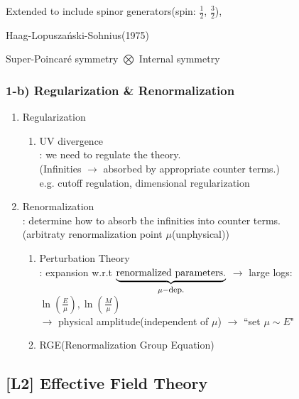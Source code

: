 \documentclass[11pt,letterpaper]{article}
\begin{document}
%
Extended to include spinor generators(spin: $\tfrac{1}{2}$, $\tfrac{3}{2}$),
%

\begin{note}
 Haag-Lopusza\'{n}ski-Sohnius(1975)
 { \normalfont
  \begin{center}
   Super-Poincar\'{e} symmetry $\bigotimes$ Internal symmetry
  \end{center}
 }
\end{note}

\VS

\subsubsection*{\normalfont \bfseries 1-b) Regularization \& Renormalization}
%
\begin{enumerate}
  \item Regularization
  \begin{enumerate}
    \item UV divergence \\
            : we need to regulate the theory. \\
         (Infinities $\rightarrow$ absorbed by appropriate counter terms.) \\
         e.g. cutoff regulation, dimensional regularization
  \end{enumerate}
  \item Renormalization \\
        : determine how to absorb the infinities into counter terms. \\
        (arbitraty renormalization point $\mu$(unphysical))
   \begin{enumerate}
     \item Perturbation Theory \\
            : expansion w.r.t $\underbrace{\mbox{renormalized parameters.}}_{\SM \mu - \mbox{dep.}}$
             $\rightarrow$ large logs: $\ln(\frac{E}{\mu}), \ln(\frac{M}{\mu})$ \\
             $\rightarrow$ physical amplitude(independent of $\mu$) $\rightarrow$ ``set $\mu \sim E$" \\
     \item RGE(Renormalization Group Equation) \\
   \end{enumerate}
\end{enumerate}

\newpage

\subsection{[L2] Effective Field Theory}
\end{document}
